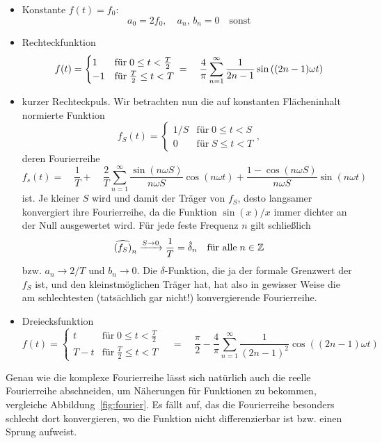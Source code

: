 \begin{itemize}
\item Konstante $f(t) = f_0$:
  \begin{equation}
    a_0 = 2 f_0,\quad a_n,\,b_n= 0\quad\text{sonst}
  \end{equation}
\item Rechteckfunktion
  \begin{equation}
    f(t) = \begin{cases}
      1 &\text{für}\; 0 \le t < \frac{T}{2} \\
      -1  &\text{für}\; \frac{T}{2} \le t < T
    \end{cases}\\
    = \quad\frac{4}{\pi}\sum_{n=1}^\infty
    \frac{1}{2n-1}\sin\left((2n-1)\omega t\right)
  \end{equation}
\item kurzer Rechteckpuls. Wir betrachten nun die auf konstanten
  Flächeninhalt normierte Funktion
  \begin{equation}
    f_S(t) = \begin{cases}
      1/S &\text{für}\; 0 \le t < S \\
      0  &\text{für}\; S \le t < T
    \end{cases},
  \end{equation}
  deren Fourierreihe
  \begin{equation}
    f_s(t) =
    \quad \frac{1}{T} +
    \quad\frac{2}{T}\sum_{n=1}^\infty
    \frac{\sin(n\omega S)}{n\omega S}\cos(n\omega t) +
    \frac{1-\cos(n\omega S)}{n\omega S}\sin(n\omega t)
  \end{equation}
  ist. Je kleiner $S$ wird und damit der Träger von $f_S$, desto
  langsamer konvergiert ihre Fourierreihe, da die Funktion $\sin(x)/x$
  immer dichter an der Null ausgewertet wird. Für jede feste Frequenz
  $n$ gilt schließlich
  \begin{equation}
    \widehat{\left(f_S\right)}_n \xrightarrow{S\to 0} \frac{1}{T} = \hat\delta_n
    \quad\text{für alle}\;n\in\mathbb{Z}
  \end{equation}
  bzw. $a_n\to 2/T$ und $b_n\to 0$. Die $\delta$-Funktion, die ja der
  formale Grenzwert der $f_S$ ist, und den kleinstmöglichen
  Träger hat, hat also in gewisser Weise die am schlechtesten
  (tatsächlich gar nicht!) konvergierende Fourierreihe.
\item Dreiecksfunktion
  \begin{equation}
    f(t) = \begin{cases}
      t      &\text{für}\; 0 \le t < \frac{T}{2} \\
      T - t  &\text{für}\; \frac{T}{2} \le t < T
    \end{cases}\quad=\quad\frac{\pi}{2} -
    \frac{4}{\pi}\sum_{n=1}^\infty
    \frac{1}{(2n-1)^2}\cos\left((2n-1)\omega t\right)
  \end{equation}
\end{itemize}
Genau wie die komplexe Fourierreihe lässt sich natürlich auch die
reelle Fourierreihe abschneiden, um Näherungen für Funktionen zu
bekommen, vergleiche Abbildung~\ref{fig:fourier}. Es fällt auf, das
die Fourierreihe besonders schlecht dort konvergieren, wo die Funktion
nicht differenzierbar ist bzw. einen Sprung aufweist.

